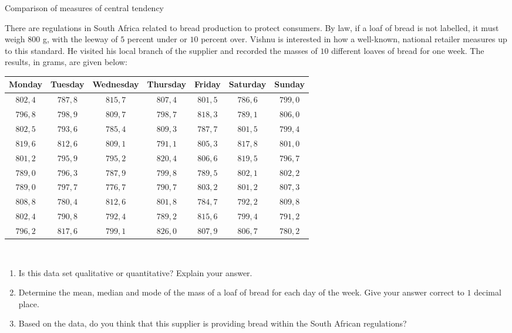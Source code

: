 \begin{wex}{Comparison of measures of central tendency}{
    There are regulations in South Africa related to bread production
    to protect consumers. By law, if a loaf of bread is not labelled,
    it must weigh $800$ g, with the leeway of $5$ percent under or $10$
    percent over.  Vishnu is interested in how a well-known, national
    retailer measures up to this standard. He visited his local branch
    of the supplier and recorded the masses of $10$ different loaves
    of bread for one week. The results, in grams, are given below:\\

    \begin{center}
      \begin{tabular}{|c|c|c|c|c|c|c|} \hline
       
        \textbf{Monday} & \textbf{Tuesday} & \textbf{Wednesday} & \textbf{Thursday} & \textbf{Friday} & \textbf{Saturday} & \textbf{Sunday} \\ \hline
        
        $802,4$ & $787,8$ & $815,7$ & $807,4$ & $801,5$ & $786,6$ & $799,0$ \\ \hline
        $796,8$ & $798,9$ & $809,7$ & $798,7$ & $818,3$ & $789,1$ & $806,0$ \\ \hline
        $802,5$ & $793,6$ & $785,4$ & $809,3$ & $787,7$ & $801,5$ & $799,4$ \\ \hline
        $819,6$ & $812,6$ & $809,1$ & $791,1$ & $805,3$ & $817,8$ & $801,0$ \\ \hline
        $801,2$ & $795,9$ & $795,2$ & $820,4$ & $806,6$ & $819,5$ & $796,7$ \\ \hline
        $789,0$ & $796,3$ & $787,9$ & $799,8$ & $789,5$ & $802,1$ & $802,2$ \\ \hline
        $789,0$ & $797,7$ & $776,7$ & $790,7$ & $803,2$ & $801,2$ & $807,3$ \\ \hline
        $808,8$ & $780,4$ & $812,6$ & $801,8$ & $784,7$ & $792,2$ & $809,8$ \\ \hline
        $802,4$ & $790,8$ & $792,4$ & $789,2$ & $815,6$ & $799,4$ & $791,2$ \\ \hline
        $796,2$ & $817,6$ & $799,1$ & $826,0$ & $807,9$ & $806,7$ & $780,2$ \\ \hline
       
      \end{tabular}
    \end{center}
\vspace{8pt}\\
    \begin{enumerate}[noitemsep, label=\textbf{\arabic*}.]
    \item Is this data set qualitative or quantitative? Explain your
      answer.
    \item Determine the mean, median and mode of the mass of a loaf of bread
      for each day of the week. Give your answer correct to $1$ decimal place.
    \item Based on the data, do you think that this supplier is
      providing bread within the South African regulations?
    \end{enumerate}
}{

}
\end{wex}

